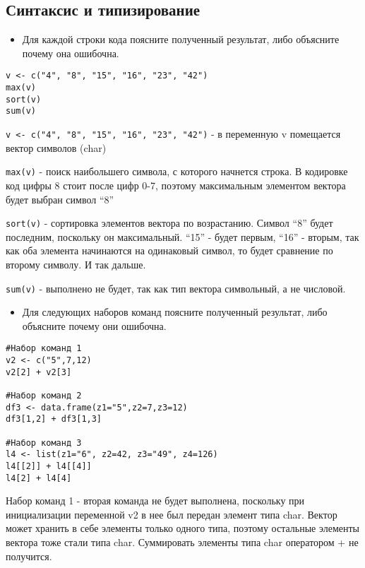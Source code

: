 \documentclass[]{article}
\providecommand{\tightlist}{%
  \setlength{\itemsep}{0pt}\setlength{\parskip}{0pt}}
\begin{document}
\subsection{Синтаксис и типизирование}\label{--}

\begin{itemize}
\tightlist
\item
  Для каждой строки кода поясните полученный результат, либо объясните
  почему она ошибочна.
\end{itemize}

\begin{verbatim}
v <- c("4", "8", "15", "16", "23", "42")
max(v)
sort(v)
sum(v)
\end{verbatim}

\texttt{v\ \textless{}-\ c("4",\ "8",\ "15",\ "16",\ "23",\ "42")} - в
переменную v помещается вектор символов (char)

\texttt{max(v)} - поиск наибольшего символа, с которого начнется строка.
В кодировке код цифры 8 стоит после цифр 0-7, поэтому максимальным
элементом вектора будет выбран символ ``8''

\texttt{sort(v)} - сортировка элементов вектора по возрастанию. Символ
``8'' будет последним, поскольку он максимальный. ``15'' - будет первым,
``16'' - вторым, так как оба элемента начинаются на одинаковый символ,
то будет сравнение по второму символу. И так дальше.

\texttt{sum(v)} - выполнено не будет, так как тип вектора символьный, а
не числовой.

\begin{itemize}
\tightlist
\item
  Для следующих наборов команд поясните полученный результат, либо
  объясните почему они ошибочна.
\end{itemize}

\begin{verbatim}
#Набор команд 1
v2 <- c("5",7,12)
v2[2] + v2[3]

#Набор команд 2
df3 <- data.frame(z1="5",z2=7,z3=12)
df3[1,2] + df3[1,3]

#Набор команд 3
l4 <- list(z1="6", z2=42, z3="49", z4=126)
l4[[2]] + l4[[4]]
l4[2] + l4[4]
\end{verbatim}

Набор команд 1 - вторая команда не будет выполнена, поскольку при
инициализации переменной v2 в нее был передан элемент типа char. Вектор
может хранить в себе элементы только одного типа, поэтому остальные
элементы вектора тоже стали типа char. Суммировать элементы типа char
оператором + не получится.
\end{document}
